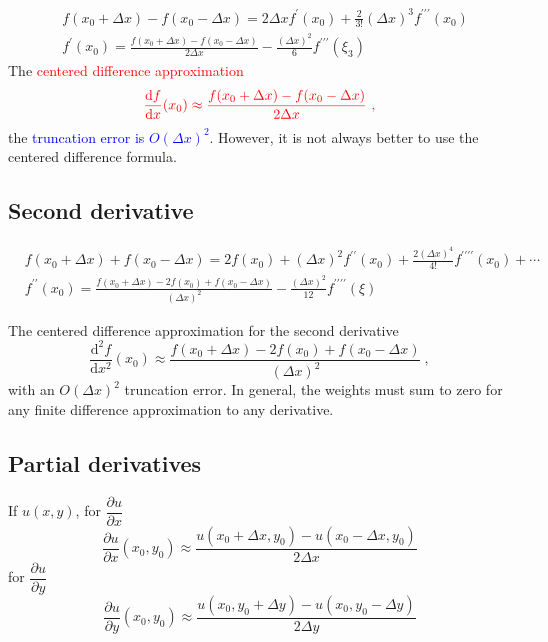 \documentclass[12pt,a4paper]{article}
\newcommand{\dif}{\mathrm{d}}
\begin{document}
\begin{align*}
& f(x_0 +\Delta x) -f(x_0 -\Delta x) = 2 \Delta x f^\prime(x_0) +\frac{2}{3!} (\Delta x)^3 f^{\prime\prime\prime}(x_0) \\
& f^\prime(x_0) = \frac{f(x_0 +\Delta x) -f(x_0 -\Delta x)}{2 \Delta x} -\frac{ (\Delta x)^2}{6} f^{\prime\prime\prime}(\xi_3)
\end{align*}
The \textcolor{red}{centered difference approximation}
\begin{equation}
\color{red} \frac{\dif f}{\dif x}(x_0) \approx \frac{f(x_0 +\Delta x) -f(x_0 -\Delta x)}{2 \Delta x} ~,
\end{equation}
the \textcolor{blue}{truncation error is $O(\Delta x)^2$}. However, it is not always better to use the centered difference formula.

\subsection{Second derivative}
\begin{align*}
& f(x_0 +\Delta x) +f(x_0 -\Delta x) = 2f(x_0) +(\Delta x)^2 f^{\prime\prime}(x_0) +\frac{2 (\Delta x)^4}{4!}  f^{\prime\prime\prime\prime}(x_0) +\cdots \\
& f^{\prime\prime}(x_0) = \frac{f(x_0 +\Delta x) -2f(x_0) + f(x_0 -\Delta x)}{(\Delta x)^2} -\frac{(\Delta x)^2}{12}  f^{\prime\prime\prime\prime}(\xi) 
\end{align*}

The centered difference approximation for the second derivative 
\begin{equation}
\frac{\dif^2 f}{\dif x^2}(x_0) \approx \frac{f(x_0 +\Delta x) -2f(x_0) + f(x_0 -\Delta x)}{(\Delta x)^2} ~,
\end{equation}
with an $O(\Delta x)^2$ truncation error. In general, the weights must sum to  zero for any finite difference approximation to any derivative.

\subsection{Partial derivatives}
If $u(x, y)$, for $\dfrac{\partial u}{\partial x}$
\begin{equation*}
\dfrac{\partial u}{\partial x}(x_0, y_0) \approx \frac{u(x_0 +\Delta x, y_0) -u(x_0 -\Delta x, y_0)}{2 \Delta x} 
\end{equation*}
for $\dfrac{\partial u}{\partial y}$
\begin{equation*}
\dfrac{\partial u}{\partial y}(x_0, y_0) \approx \frac{u(x_0, y_0 +\Delta y) -u(x_0, y_0-\Delta y)}{2 \Delta y} 
\end{equation*}
\end{document}

